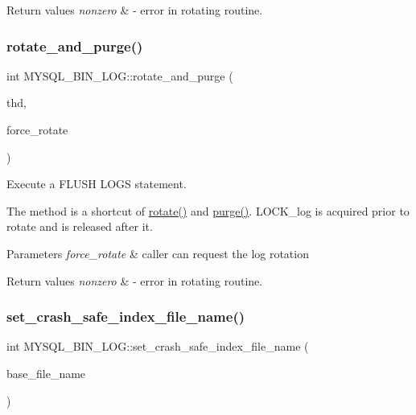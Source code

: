 \begin{DoxyRetVals}{Return values}
{\em nonzero} & -\/ error in rotating routine. \\
\hline
\end{DoxyRetVals}
\mbox{\label{group__Binary__Log_ga9f41b228c438fe7b4c710b8fdd780cfb}} 
\subsubsection{\texorpdfstring{rotate\+\_\+and\+\_\+purge()}{rotate\_and\_purge()}}
{\footnotesize\ttfamily int M\+Y\+S\+Q\+L\+\_\+\+B\+I\+N\+\_\+\+L\+O\+G\+::rotate\+\_\+and\+\_\+purge (\begin{DoxyParamCaption}\item[{T\+HD $\ast$}]{thd,  }\item[{bool}]{force\+\_\+rotate }\end{DoxyParamCaption})}

Execute a F\+L\+U\+SH L\+O\+GS statement.

The method is a shortcut of {\ttfamily \mbox{\hyperlink{group__Binary__Log_ga2053b0b53a46eb5702b44966497c333f}{rotate()}}} and {\ttfamily \mbox{\hyperlink{group__Binary__Log_gaff1889360685bd90b1d3ffba10ba3dba}{purge()}}}. L\+O\+C\+K\+\_\+log is acquired prior to rotate and is released after it.


\begin{DoxyParams}{Parameters}
{\em force\+\_\+rotate} & caller can request the log rotation\\
\hline
\end{DoxyParams}

\begin{DoxyRetVals}{Return values}
{\em nonzero} & -\/ error in rotating routine. \\
\hline
\end{DoxyRetVals}
\mbox{\label{group__Binary__Log_ga5bbd66f9464d9a83f33fdcdba20d7d99}} 
\subsubsection{\texorpdfstring{set\+\_\+crash\+\_\+safe\+\_\+index\+\_\+file\+\_\+name()}{set\_crash\_safe\_index\_file\_name()}}
{\footnotesize\ttfamily int M\+Y\+S\+Q\+L\+\_\+\+B\+I\+N\+\_\+\+L\+O\+G\+::set\+\_\+crash\+\_\+safe\+\_\+index\+\_\+file\+\_\+name (\begin{DoxyParamCaption}\item[{const char $\ast$}]{base\+\_\+file\+\_\+name }\end{DoxyParamCaption})}

